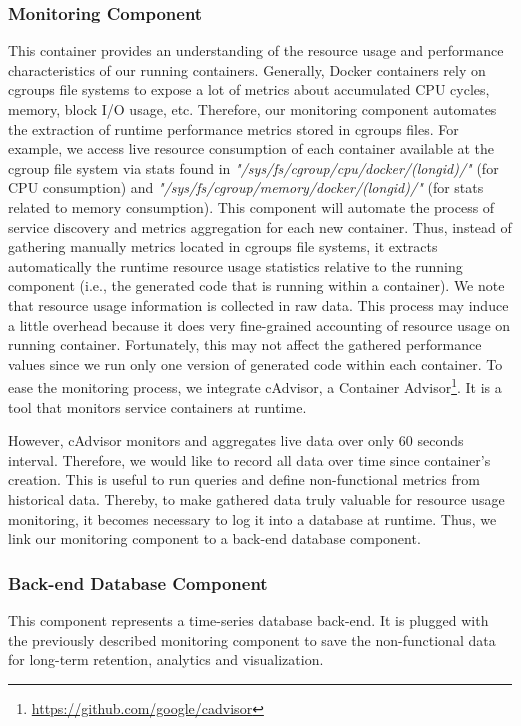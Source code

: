 \subsubsection{Monitoring Component}
This container provides an understanding of the resource usage and performance characteristics of our running containers. Generally, Docker containers rely on cgroups file systems to expose a lot of metrics about accumulated CPU cycles, memory, block I/O usage, etc. Therefore, our monitoring component automates the extraction of runtime performance metrics stored in cgroups files. For example, we access live resource consumption of each container available at the cgroup file system via stats found in \textit{"/sys/fs/cgroup/cpu/docker/(longid)/"} (for CPU consumption) and \textit{"/sys/fs/cgroup/memory/docker/(longid)/"} (for stats related to memory consumption). This component will automate the process of service discovery and metrics aggregation for each new container. Thus, instead of gathering manually metrics located in cgroups file systems, it extracts automatically the runtime resource usage statistics relative to the running component (i.e., the generated code that is running within a container). We note that resource usage information is collected in raw data. This process may induce a little overhead because it does very fine-grained accounting of resource usage on running container. Fortunately, this may not affect the gathered performance values since we run only one version of generated code within each container.
To ease the monitoring process, we integrate cAdvisor, a Container Advisor\footnote{\url{https://github.com/google/cadvisor}}. It is a tool that monitors service containers at runtime. 

However, cAdvisor monitors and aggregates live data over only 60 seconds interval. Therefore, we would like to record all data over time since container's creation. This is useful to run queries and define non-functional metrics from historical data. Thereby, to make gathered data truly valuable for resource usage monitoring, it becomes necessary to log it into a database at runtime. Thus, we link our monitoring component to a back-end database component. 
\subsubsection{Back-end Database Component}
This component represents a time-series database back-end. It is plugged with the previously described monitoring component to save the non-functional data for long-term retention, analytics and visualization. 

